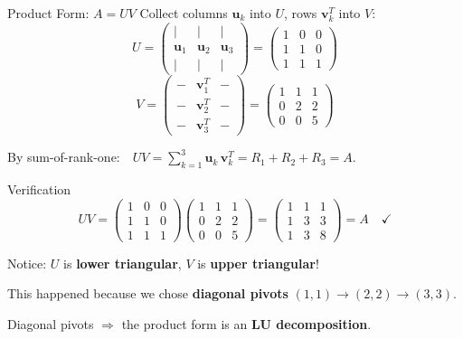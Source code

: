 \documentclass[10pt]{beamer}
\theoremstyle{definition}
\newcommand{\x}[1]{\alert{\textbf{#1}}}
\begin{document}
\begin{frame}{Product Form: $A = UV$}
Collect columns $\mathbf{u}_k$ into $U$, rows $\mathbf{v}_k^T$ into $V$:
$$U = \begin{pmatrix}
| & | & | \\
\mathbf{u}_1 & \mathbf{u}_2 & \mathbf{u}_3 \\
| & | & |
\end{pmatrix}
= \begin{pmatrix}
1 & 0 & 0 \\
1 & 1 & 0 \\
1 & 1 & 1
\end{pmatrix}$$
$$V = \begin{pmatrix}
- & \mathbf{v}_1^T & - \\
- & \mathbf{v}_2^T & - \\
- & \mathbf{v}_3^T & -
\end{pmatrix}
= \begin{pmatrix}
1 & 1 & 1 \\
0 & 2 & 2 \\
0 & 0 & 5
\end{pmatrix}$$

By sum-of-rank-one:\ \ $UV = \sum_{k=1}^{3} \mathbf{u}_k\, \mathbf{v}_k^T = R_1 + R_2 + R_3 = A$.
\end{frame}

\begin{frame}{Verification}
$$UV = \begin{pmatrix}
1 & 0 & 0 \\
1 & 1 & 0 \\
1 & 1 & 1
\end{pmatrix}
\begin{pmatrix}
1 & 1 & 1 \\
0 & 2 & 2 \\
0 & 0 & 5
\end{pmatrix}
= \begin{pmatrix}
1 & 1 & 1 \\
1 & 3 & 3 \\
1 & 3 & 8
\end{pmatrix} = A \quad \checkmark$$

\vfill
Notice: $U$ is \x{lower triangular}, $V$ is \x{upper triangular}!

\vfill
This happened because we chose \x{diagonal pivots} $(1,1) \to (2,2) \to (3,3)$.

\vfill
Diagonal pivots $\Longrightarrow$ the product form is an \x{LU decomposition}.
\end{frame}
\end{document}
